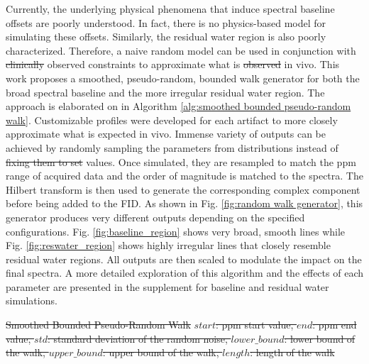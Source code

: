 \documentclass[AMA,LATO1COL]{WileyNJD-v2}
\providecommand{\DIFadd}[1]{{\protect\color{blue}\uwave{#1}}} %
\providecommand{\DIFdel}[1]{{\protect\color{red}\sout{#1}}}                      %
\providecommand{\DIFaddbegin}{} %
\providecommand{\DIFaddend}{} %
\providecommand{\DIFdelbegin}{} %
\providecommand{\DIFdelend}{} %
\begin{document}
\DIFaddend Currently, the underlying physical phenomena that induce spectral baseline offsets are poorly understood. In fact, there is no physics-based model for simulating these offsets. Similarly, the residual water region is also poorly characterized. Therefore, a naive random model can be used in conjunction with \DIFdelbegin \DIFdel{clinically }\DIFdelend observed constraints to approximate what is \DIFdelbegin \DIFdel{observed }\DIFdelend \DIFaddbegin \DIFadd{expected }\DIFaddend in vivo. This work proposes a smoothed, pseudo-random, bounded walk generator for both the broad spectral baseline and the more irregular residual water region. The approach is elaborated on in Algorithm \ref{alg:smoothed bounded pseudo-random walk}. Customizable profiles were developed for each artifact to more closely approximate what is expected in vivo. Immense variety of outputs can be achieved by randomly sampling the parameters from distributions instead of \DIFdelbegin \DIFdel{fixing them to set }\DIFdelend \DIFaddbegin \DIFadd{using fixed }\DIFaddend values. Once simulated, they are resampled to match the ppm range of acquired data and the order of magnitude is matched to the spectra. The Hilbert transform is then used to generate the corresponding complex component before being added to the FID. As shown in Fig. \ref{fig:random walk generator}, this generator produces very different outputs depending on the specified configurations. Fig. \ref{fig:baseline_region} shows very broad, smooth lines while Fig. \ref{fig:reswater_region} shows highly irregular lines that closely resemble residual water regions. All outputs are then scaled to modulate the impact on the final spectra. A more detailed exploration of this algorithm and the effects of each parameter are presented in the supplement for baseline and residual water simulations.

\DIFdelbegin %
{%
\DIFdel{Smoothed Bounded Pseudo-Random Walk}} %
\DIFdel{$start$: ppm start value, $end$: ppm end value, $std$: standard deviation of the random noise, $lower\_bound$: lower bound of the walk, $upper\_bound$: upper bound of the walk, $length$: length of the walk
}%
\end{document}
